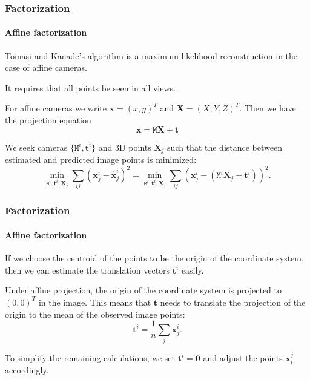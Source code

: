 \documentclass[aspectratio=169]{beamer}
\renewcommand{\vec}[1]{\boldsymbol{#1}}
\newcommand{\mat}[1]{\mathtt{#1}}
\begin{document}
\begin{frame}
\frametitle{Factorization}
\framesubtitle{Affine factorization}

Tomasi and Kanade's algorithm is a maximum likelihood reconstruction
in the case of \alert{affine} cameras.

\medskip

It requires that \alert{all points} be seen in \alert{all views}.

\medskip

For affine cameras we write $\vec{x}=(x,y)^T$ and
$\vec{X}=(X,Y,Z)^T$.  Then we have the projection equation
\begin{equation*}
\vec{x} = \mat{M} \vec{X} + \vec{t}
\end{equation*}

We seek cameras $\{\mat{M}^i,\vec{t}^i\}$ and 3D points $\vec{X}_j$
such that the distance between estimated and predicted image points is
minimized:
\begin{equation*}
\min_{\mat{M}^i,\vec{t}^i,\vec{X}_j}
\sum_{ij}(\vec{x}_j^i-\hat{\vec{x}}_j^i)^2 =
\min_{\mat{M}^i,\vec{t}^i,\vec{X}_j}
\sum_{ij}\left(\vec{x}_j^i-(\mat{M}^i\vec{X}_j+\vec{t}^i)\right)^2.
\end{equation*}

\end{frame}

\begin{frame}
\frametitle{Factorization}
\framesubtitle{Affine factorization}

If we choose the centroid of the points to be the origin of the
coordinate system, then we can estimate the \alert{translation
  vectors} $\vec{t}^i$ easily.

\medskip

Under affine projection, the origin of the coordinate system is
projected to $(0,0)^T$ in the image.  This means that $\vec{t}$ needs
to translate the projection of the origin to the mean of the observed
image points:
\begin{equation*}
\vec{t}^i = \frac{1}{n} \sum_j \vec{x}^i_j.
\end{equation*}

\medskip

To simplify the remaining calculations, we set $\vec{t}^i=\vec{0}$ and
adjust the points $\vec{x}_i^j$ accordingly.

\end{frame}
\end{document}
